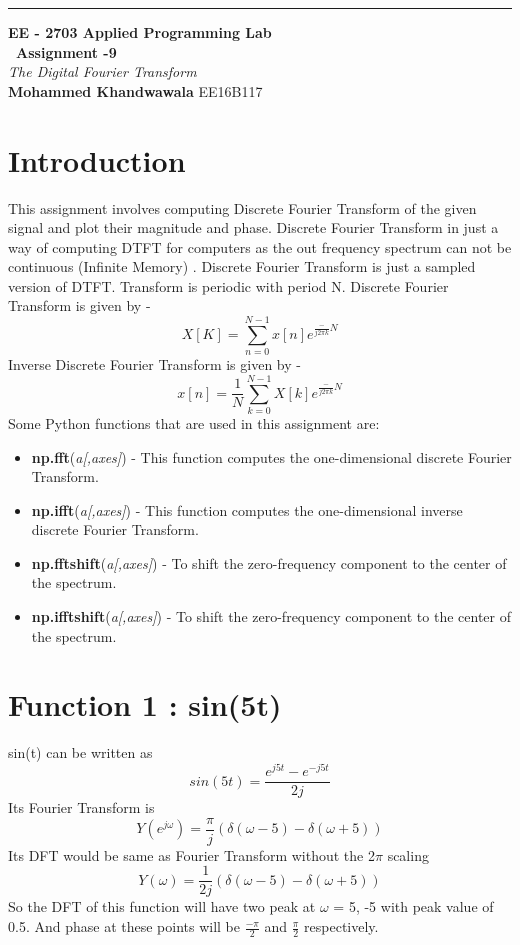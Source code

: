 \documentclass[a4paper]{article}
\begin{document}
\begin{titlepage}
	\raggedleft
	\rule{1pt}{\textheight} 
	\hspace{0.05\textwidth} 
	\parbox[b]{0.75\textwidth}{		
		{\LARGE\bfseries EE - 2703 Applied Programming Lab \\[0.5\baselineskip]  ~\huge Assignment -9}\\[2\baselineskip] 
		{\large\textit{The Digital Fourier Transform}}\\[4\baselineskip] 
		{\Large\textbf{Mohammed Khandwawala}}
        \large EE16B117
		\vspace{0.5\textheight}  
	}

\end{titlepage}


\tableofcontents


\section{Introduction}
This assignment involves computing Discrete Fourier Transform of the given signal and plot their magnitude and phase.
Discrete Fourier Transform in just a way of computing DTFT for computers as the out frequency spectrum can not be continuous (Infinite Memory) . Discrete Fourier Transform is just a sampled version of DTFT. Transform is periodic with period N.
Discrete Fourier Transform is given by -
$$ X[K] = \sum_{n=0}^{N-1} x[n]e^{\frac-{j2\pi k}{N}}$$
Inverse Discrete Fourier Transform is given by -
$$ x[n] = \frac{1}{N}\sum_{k=0}^{N-1} X[k]e^{\frac-{j2\pi k}{N}}$$
Some Python functions that are used in this assignment are:
\begin{itemize}
\item \textbf{np.fft}(\textit{a[,axes]}) - This function computes the one-dimensional discrete Fourier Transform.
\item \textbf{np.ifft}(\textit{a[,axes]}) - This function computes the one-dimensional inverse discrete Fourier Transform.
\item \textbf{np.fftshift}(\textit{a[,axes]}) - To shift the zero-frequency component to the center of the spectrum.
\item \textbf{np.ifftshift}(\textit{a[,axes]}) - To shift the zero-frequency component to the center of the spectrum.
\end{itemize}
\section{Function 1 : sin(5t)}
sin(t) can be written as $$sin(5t) = \frac{e^{j5t} - e^{-j5t}}{2j}$$
Its Fourier Transform is $$Y(e^{j\omega}) = \frac{\pi}{j} (\delta(\omega - 5) - \delta(\omega + 5))$$
Its DFT would be same as Fourier Transform without the 2$\pi$ scaling $$Y(\omega) = \frac{1}{2j} (\delta(\omega - 5) - \delta(\omega + 5))$$
So the DFT of this function will have two peak at $\omega$ = 5, -5 with peak value of 0.5. And phase at these points will be $\frac{-\pi}{2}$ and $\frac{\pi}{2}$ respectively.
\end{document}
